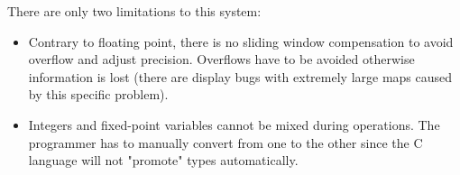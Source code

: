 There are only two limitations to this system:
\begin{itemize}
  \item Contrary to floating point, there is no sliding window compensation to avoid overflow and adjust precision. Overflows have to be avoided otherwise information is lost (there are display bugs with extremely large maps caused by this specific problem). 
  \item Integers and fixed-point variables cannot be mixed during operations. The programmer has to manually convert from one to the other since the C language will not "promote" types automatically.
\end{itemize}
 


\pagebreak

